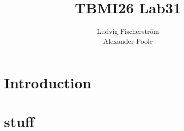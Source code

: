\documentclass[a4paper,12pt]{article}
\title{TBMI26 Lab31}
\author{Ludvig Fischerstr\"{o}m \\Alexander Poole\\}
\begin{document}
\maketitle
	\thispagestyle{empty}
\newpage


\section*{Introduction}

\section*{stuff}
\end{document}
